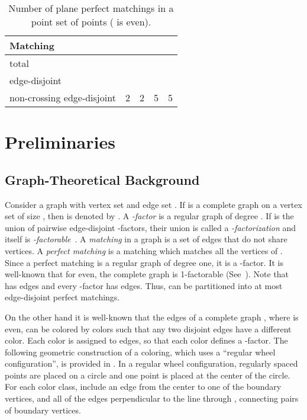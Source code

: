 \documentclass[11pt,a4paper]{article}
\begin{document}
\begin{table}
\caption{Number of plane perfect matchings in a point set  of  points ( is even).}
\label{table1}
\centering
    \begin{tabular}{|l||@{\hskip 0.15in}c@{\hskip 0.15in}|@{\hskip 0.15in}c@{\hskip 0.15in}|@{\hskip 0.15in}c@{\hskip 0.15in}|@{\hskip 0.15in}c@{\hskip 0.15in}|}
         \hline
             Matching 	&  &&&  \\ \hline\hline
             total& 	\cite{Garcia2000, Motzkin1948}&\cite{Motzkin1948}&\cite{Garcia2000}& \cite{Sharir2006}\\\hline\hline
		 edge-disjoint& && &\\
             non-crossing edge-disjoint& 2 & 2&5&5 \\
         \hline
    \end{tabular}
\end{table}

\section{Preliminaries}
\label{preliminaries}

\subsection{Graph-Theoretical Background}
\label{graph-background-section}
Consider a graph  with vertex set  and edge set . If  is a complete graph on a vertex set  of size , then  is denoted by .
A {\em -factor} is a regular graph of degree . If  is the union of pairwise edge-disjoint -factors, their union is called a {\em-factorization} and  itself is {\em-factorable}~\cite{Harary1991}. A {\em matching} in a graph  is a set of edges that do not share vertices. A {\em perfect matching} is a matching which matches all the vertices of . Since a perfect matching is a regular graph of degree one, it is a -factor. It is well-known that for  even, the complete graph  is 1-factorable (See~\cite{Harary1991}).
Note that  has  edges and every -factor has  edges. Thus,  can be partitioned into at most  edge-disjoint perfect matchings.

On the other hand it is well-known that the edges of a complete graph , where  is even, can be colored by  colors such that any two disjoint edges have a different color. Each color is assigned to  edges, so that each color defines a -factor. The following geometric construction of a coloring, which uses a ``regular wheel configuration'', is provided in \cite{Soifer2009}. In a regular wheel configuration,  regularly spaced points are placed on a circle and one point is placed at the center of the circle. For each color class, include an edge  from the center to one of the boundary vertices, and all of the edges perpendicular to the line through , connecting pairs of boundary vertices.
\end{document}
